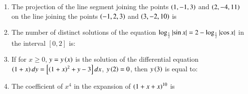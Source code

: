 \documentclass[journal,12pt,twocolumn]{IEEEtran}
\theoremstyle{remark}
\begin{document}
\begin{enumerate}
    \item The projection of the line segment joining the points $\left(1,-1,3\right)$ and $\left(2,-4,11\right)$ on the line joining the points $\left(-1,2,3\right)$ and $\left(3,-2,10\right)$ is
		
    \item The number of distinct solutions of the equation $\log_{\frac{1}{2}}\left\vert\sin x\right\vert = 2-\log_{\frac{1}{2}}\left\vert\cos x\right\vert$ in the interval $\left[0, 2\right]$ is:

    \item If for $x\geq 0$, $y=y\left(x\right)$ is the solution of the differential equation $\left(1+x\right)dy=\left[ \left(1+x\right)^2 +y-3\right]dx$, $y\left(2\right)=0$, then $y\left(3\right)$ is equal to:
	
    \item The coefficient of $x^4$ in the expansion of $\left(1+x+x\right)^{10}$ is

\end{enumerate}
\end{document}
